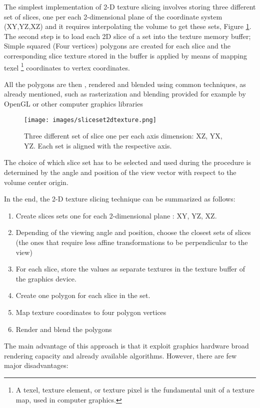 \documentclass[12pt,a4paper]{extarticle}
\newcommand{\linespace}{\vspace{8pt}}
\begin{document}
The simplest implementation of 2-D texture slicing involves storing three different set of slices, one per each 2-dimensional plane of the coordinate system (XY,YZ,XZ) and it requires interpolating the volume to get these sets, Figure \ref{fig:slicingset2dtexture}.
The second step is to load each 2D slice of a set into the texture memory buffer;  Simple squared (Four vertices) polygons are created for each slice and the corresponding slice texture stored in the buffer is applied by means of mapping texel \footnote{A texel, texture element, or texture pixel is the fundamental unit of a texture map,\cite{glassner1989an} used in computer graphics.} coordinates to vertex coordinates.

All the polygons are then , rendered and blended using common techniques, as already mentioned, such as rasterization and blending provided for example by OpenGL or other computer graphics libraries

\begin{figure}[hbtp]
\centering
\texttt{[image: images/sliceset2dtexture.png]}
\caption{Three different set of slice one per each axis dimension: XZ, YX, YZ. Each set is aligned with the respective axis.}
\label{fig:slicingset2dtexture}
\end{figure}


The choice of which slice set has to be selected and used during the procedure is determined by the angle and position of the view vector with respect to the volume center origin.

In the end, the 2-D texture slicing technique can be summarized as follows:
\begin{enumerate}
\item Create slices sets one for each 2-dimensional plane : XY, YZ, XZ.
\item Depending of the viewing angle and position, choose the closest sets of slices (the ones that require less affine transformations to be perpendicular to the view)
\item For each slice, store the values as separate textures in the texture buffer of the graphics device.
\item Create one polygon for each slice in the set.
\item Map texture coordinates to four polygon vertices
\item Render and blend the polygons
\end{enumerate}
\linespace

The main advantage of this approach is that it exploit graphics hardware broad rendering capacity and already available algorithms. However, there are few major disadvantages: 
\end{document}
